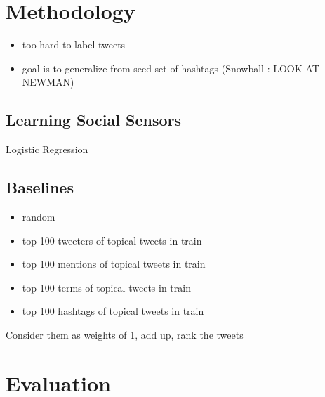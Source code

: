 \documentclass{acm_proc_article-sp}
\begin{document}


\section{Methodology}
\begin{itemize}
\item too hard to label tweets
\item goal is to generalize from seed set of hashtags (Snowball : LOOK AT NEWMAN)
\end{itemize}

\subsection{Learning Social Sensors}
Logistic Regression

\subsection{Baselines}
\begin{itemize}
\item random
\item top 100 tweeters of  topical tweets in train
\item top 100 mentions of topical tweets in train
\item top 100 terms of topical tweets in train
\item top 100 hashtags of topical tweets in train
\end{itemize}
Consider them as weights of 1, add up, rank the tweets

\section{Evaluation}
\end{document}
